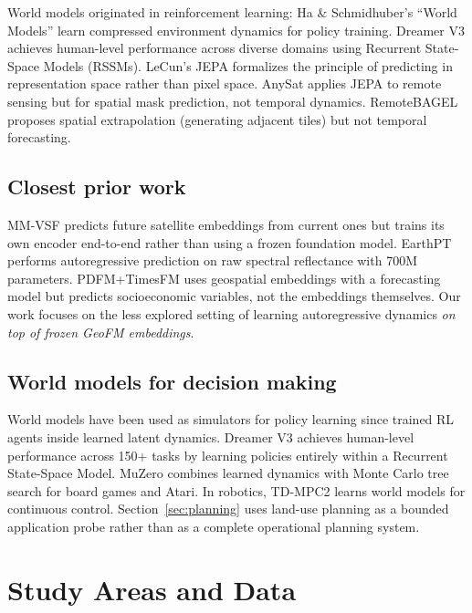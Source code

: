 \documentclass{article}
\begin{document}
World models originated in reinforcement learning: Ha \& Schmidhuber's ``World Models'' \citep{ha2018world} learn compressed environment dynamics for policy training. Dreamer V3 \citep{hafner2023dreamerv3} achieves human-level performance across diverse domains using Recurrent State-Space Models (RSSMs). LeCun's JEPA \citep{lecun2022jepa} formalizes the principle of predicting in representation space rather than pixel space. AnySat \citep{astruc2024anysat} applies JEPA to remote sensing but for spatial mask prediction, not temporal dynamics. RemoteBAGEL \citep{remotebagel2025} proposes spatial extrapolation (generating adjacent tiles) but not temporal forecasting.

\subsection{Closest prior work}

MM-VSF \citep{mmvsf2024} predicts future satellite embeddings from current ones but trains its own encoder end-to-end rather than using a frozen foundation model. EarthPT \citep{smith2023earthpt} performs autoregressive prediction on raw spectral reflectance with 700M parameters. PDFM+TimesFM \citep{google2024pdfm} uses geospatial embeddings with a forecasting model but predicts socioeconomic variables, not the embeddings themselves. Our work focuses on the less explored setting of learning autoregressive dynamics \textit{on top of frozen GeoFM embeddings}.

\subsection{World models for decision making}

World models have been used as simulators for policy learning since \citet{ha2018world} trained RL agents inside learned latent dynamics. Dreamer V3 \citep{hafner2023dreamerv3} achieves human-level performance across 150+ tasks by learning policies entirely within a Recurrent State-Space Model. MuZero \citep{schrittwieser2020muzero} combines learned dynamics with Monte Carlo tree search for board games and Atari. In robotics, TD-MPC2 \citep{hansen2024tdmpc2} learns world models for continuous control. Section~\ref{sec:planning} uses land-use planning as a bounded application probe rather than as a complete operational planning system.


\section{Study Areas and Data}
\label{sec:data}
\end{document}
